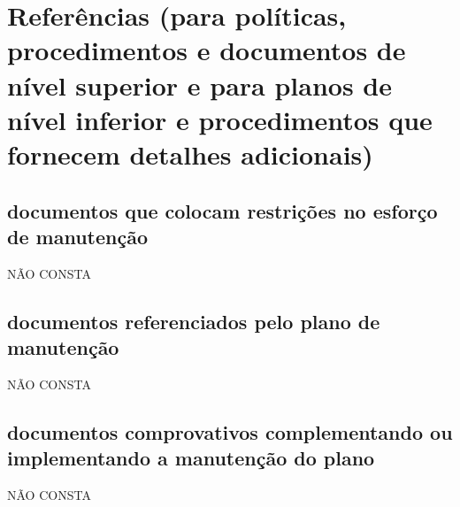\chapter{Referências (para políticas, procedimentos e documentos de nível superior e para planos de nível inferior e procedimentos que fornecem detalhes adicionais)}

\section{documentos que colocam restrições no esforço de manutenção}
NÃO CONSTA
\section{documentos referenciados pelo plano de manutenção}
NÃO CONSTA
\section{documentos comprovativos complementando ou implementando a manutenção do plano}
NÃO CONSTA
